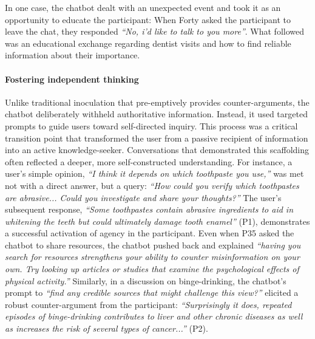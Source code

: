 \documentclass[sigconf]{acmart}
\begin{document}
In one case, the chatbot dealt with an unexpected event and took it as an opportunity to educate the participant: 
When Forty asked the participant to leave the chat, they responded \textit{``No, i'd like to talk to you more''}. What followed was an educational exchange regarding dentist visits and how to find reliable information about their importance.

\paragraph{Fostering independent thinking}
 Unlike traditional inoculation that pre-emptively provides counter-arguments, the chatbot deliberately withheld authoritative information. Instead, it used targeted prompts to guide users toward self-directed inquiry. This process was a critical transition point that transformed the user from a passive recipient of information into an active knowledge-seeker. Conversations that demonstrated this scaffolding often reflected a deeper, more self-constructed understanding. For instance, a user's simple opinion, \textit{``I think it depends on which toothpaste you use,''} was met not with a direct answer, but a query: \textit{``How could you verify which toothpastes are abrasive... Could you investigate and share your thoughts?''} The user's subsequent response, \textit{``Some toothpastes contain abrasive ingredients to aid in whitening the teeth but could ultimately damage tooth enamel''} (P1), demonstrates a successful activation of agency in the participant. Even when P35 asked the chatbot to share resources, the chatbot pushed back and explained \textit{``having you search for resources strengthens your ability to counter misinformation on your own. Try looking up articles or studies that examine the psychological effects of physical activity.''} Similarly, in a discussion on binge-drinking, the chatbot's prompt to \textit{``find any credible sources that might challenge this view?''} elicited a robust counter-argument from the participant: \textit{``Surprisingly it does, repeated episodes of binge-drinking contributes to liver and other chronic diseases as well as increases the risk of several types of cancer...''} (P2). 
\end{document}

